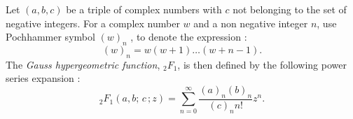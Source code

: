 \documentclass[12pt]{article}
\begin{document}
Let $(a,b,c)$ be a triple of complex numbers with $c$ not belonging to the set of negative integers. For a complex number $w$ and a non negative integer $n$, use Pochhammer symbol $(w)_n$ , to denote the expression : $$(w)_n=w(w+1)\dots(w+n-1).$$ The \emph{Gauss hypergeometric function}, $_{2}F_{1}$, is then defined by the following power series expansion : $$_2F_1(a,b;\,c\,;z)=\sum_{n=0}^{\infty} \frac{(a)_n(b)_n}{(c)_{n}n!}z^n.$$
\end{document}
